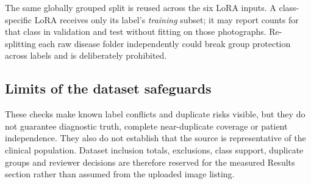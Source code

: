 The same globally grouped split is reused across the six LoRA inputs. A class-specific LoRA receives only its label's \emph{training} subset; it may report counts for that class in validation and test without fitting on those photographs. Re-splitting each raw disease folder independently could break group protection across labels and is deliberately prohibited.

\subsection{Limits of the dataset safeguards}
These checks make known label conflicts and duplicate risks visible, but they do not guarantee diagnostic truth, complete near-duplicate coverage or patient independence. They also do not establish that the source is representative of the clinical population. Dataset inclusion totals, exclusions, class support, duplicate groups and reviewer decisions are therefore reserved for the measured Results section rather than assumed from the uploaded image listing.
